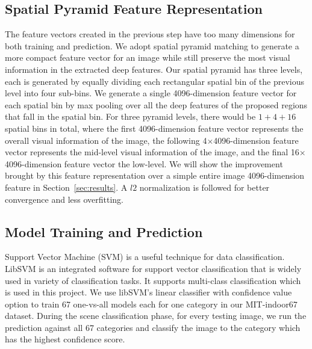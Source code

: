 \subsection{Spatial Pyramid Feature Representation}
The feature vectors created in the previous step have too many dimensions for
both training and prediction. We adopt spatial pyramid matching to generate
a more compact feature vector for an image while still preserve the most visual
information in the extracted deep features. Our spatial pyramid has three
levels, each is generated by equally dividing each rectangular spatial bin of
the previous level into four sub-bins. We generate a single 4096-dimension
feature vector for each spatial bin by max pooling over all the deep features
of the proposed regions that fall in the spatial bin. For three pyramid levels,
there would be $1+4+16$ spatial bins in total, where the first 4096-dimension
feature vector represents the overall visual information of the image, the
following 4$\times$4096-dimension feature vector represents the mid-level
visual information of the image, and the final 16$\times$4096-dimension feature
vector the low-level. We will show the improvement brought by this feature
representation over a simple entire image 4096-dimension feature in
Section~\ref{sec:results}. A $l2$ normalization is followed for better
convergence and less overfitting.

\subsection{Model Training and Prediction}
Support Vector Machine (SVM) is a useful technique for data classification.
LibSVM\cite{Chang:2011:CC01a} is an integrated software for support vector
classification that is widely used in variety of classification tasks. It
supports multi-class classification which is used in this project. We use
libSVM's linear classifier with confidence value option to train 67 one-vs-all
models each for one category in our MIT-indoor67 dataset. During the scene
classification phase, for every testing image, we run the prediction against
all 67 categories and classify the image to the category which has the highest
confidence score.
